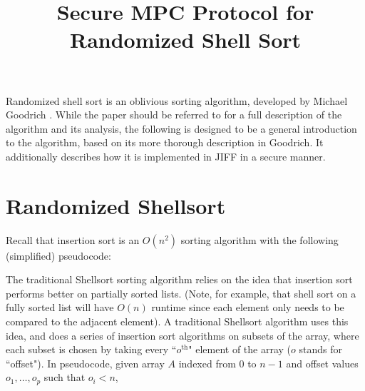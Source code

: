 \documentclass[11pt, oneside]{article}   	%
\title{Secure MPC Protocol for Randomized Shell Sort}
\begin{document}
\maketitle

Randomized shell sort is an oblivious sorting algorithm, developed by Michael Goodrich \cite{goodrich2010randomized}. While the paper should be referred to for a full description of the algorithm and its analysis, the following is designed to be a general introduction to the algorithm, based on its more thorough description in Goodrich\cite{goodrich2010randomized}. It additionally describes how it is implemented in JIFF in a secure manner. 

\section{Randomized Shellsort}

Recall that insertion sort is an $O(n^2)$ sorting algorithm with the following (simplified) pseudocode:

\begin{center}
\begin{algorithmic}
\ENDFOR
\end{algorithmic}
\end{center}

The traditional Shellsort sorting algorithm relies on the idea that insertion sort performs better on partially sorted lists. (Note, for example, that shell sort on a fully sorted list will have $O(n)$ runtime since each element only needs to be compared to the adjacent element). A traditional Shellsort algorithm uses this idea, and does a series of insertion sort algorithms on subsets of the array, where each subset is chosen by taking every ``$o^{\text{th}}$" element of the array ($o$ stands for ``offset"). In pseudocode, given array $A$ indexed from $0$ to $n-1$ and offset values $o_1,\ldots,o_p$ such that $o_i < n$, 

\begin{center}
\begin{algorithmic}
	\ENDFOR
\ENDFOR
\end{algorithmic}
\end{center}
\end{document}
